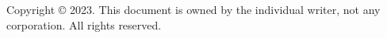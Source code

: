 %



\backmatter



\listoffigures






\vfill
\noindent
{\scriptsize\relax
Copyright © 2023.
This document is owned by the individual writer, not any corporation. All rights reserved.}





